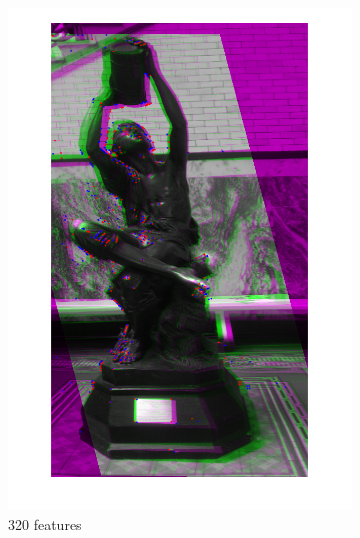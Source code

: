 \documentclass[sigconf]{acmart/acmart}
\begin{document}
\begin{figure}[h]
\begin{subfigure}[b]{0.3\textwidth}
    	\includegraphics[width=\textwidth]{figures/alignment/fused_320_features_16_iterations}
    	\caption{320 features}
    \end{subfigure}
    \begin{subfigure}[b]{0.3\textwidth}
    	\centering

\end{subfigure}
\end{figure}
\end{document}

